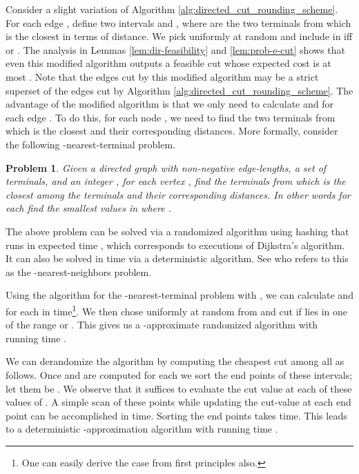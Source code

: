 \documentclass[11pt]{article}
\newtheorem{prob}{Problem}
\begin{document}
Consider a slight variation of Algorithm
\ref{alg:directed_cut_rounding_scheme}. For each edge ,
define two intervals  and , where  are the two terminals
from which  is the closest in terms of distance. We pick  uniformly at random and include  in  iff  or . The analysis in Lemmas
\ref{lem:dir-feasibility} and \ref{lem:prob-e-cut} shows that even
this modified algorithm outputs a feasible cut whose expected cost is at
most . Note that the edges cut by this modified
algorithm may be a strict superset of the edges cut by Algorithm
\ref{alg:directed_cut_rounding_scheme}. The advantage of the modified
algorithm is that we only need to calculate  and  for
each edge . To do this, for each node , we need to find
the two terminals from which  is the closest and their
corresponding distances. More formally, consider the following
-nearest-terminal problem.

\begin{prob}
  Given a directed graph  with non-negative edge-lengths, a set  of  terminals, and an integer , for each
  vertex , find the  terminals from which  is the closest
  among the terminals and their corresponding distances. In other
  words for each  find the  smallest values in 
   where .
\end{prob}

The above problem can be solved via a randomized algorithm using
hashing that runs in expected time , which
corresponds to  executions of Dijkstra's algorithm.  It can also be
solved in  time via a deterministic
algorithm. See \cite{HarPeled15} who refers to this as the
-nearest-neighbors problem.

Using the algorithm for the -nearest-terminal problem with ,
we can calculate  and  for each  in  time\footnote{One can easily derive the  case from first
  principles also.}.  We then chose  uniformly at random from
 and cut  if  lies in one of the range  or
. This gives us a -approximate randomized algorithm with
running time .


\iffalse
\begin{prob}
  Given a directed  with non-negative edge-weights, a subset
   of terminals, for each vertex , find two closest
  vertices(and distances) in  i.e. find  and
   such that , we have . Here,
   denotes the shortest path length from  to  using edge
  lengths given by .
\end{prob}
This problem, referred to as the can be solved in 
time \cite{HarPeled15}.
\fi


We can derandomize the algorithm by computing the cheapest cut among
all  as follows. Once  and  are
computed for each  we sort the  end points of these 
intervals; let them be .  We observe that it suffices to evaluate the cut value
at each of these values of .  A simple scan of these 
points while updating the cut-value at each end point can be
accomplished in  time. Sorting the end points takes  time.  This leads to a deterministic -approximation algorithm
with running time .
\end{document}
